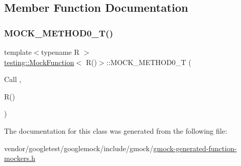 \subsection{Member Function Documentation}
\mbox{\label{classtesting_1_1_mock_function_3_01_r_07_08_4_a08e7016e3e060a5cd375b66ff0cc04e8}} 
\subsubsection{\texorpdfstring{M\+O\+C\+K\+\_\+\+M\+E\+T\+H\+O\+D0\+\_\+\+T()}{MOCK\_METHOD0\_T()}}
{\footnotesize\ttfamily template$<$typename R $>$ \\
\hyperlink{classtesting_1_1_mock_function}{testing\+::\+Mock\+Function}$<$ R()$>$\+::M\+O\+C\+K\+\_\+\+M\+E\+T\+H\+O\+D0\+\_\+T (\begin{DoxyParamCaption}\item[{Call}]{,  }\item[{R()}]{ }\end{DoxyParamCaption})}



The documentation for this class was generated from the following file\+:\begin{DoxyCompactItemize}
\item 
vendor/googletest/googlemock/include/gmock/\hyperlink{gmock-generated-function-mockers_8h}{gmock-\/generated-\/function-\/mockers.\+h}\end{DoxyCompactItemize}
